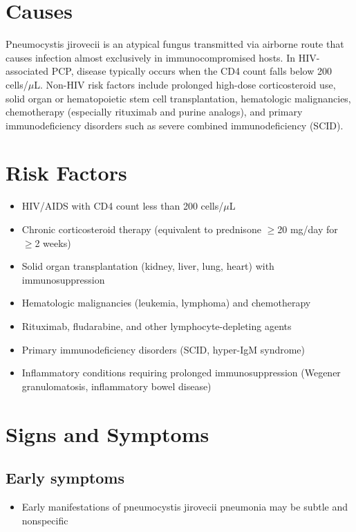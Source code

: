 \section{Causes}
Pneumocystis jirovecii is an atypical fungus transmitted via airborne route that causes infection almost exclusively in immunocompromised hosts. In HIV-associated PCP, disease typically occurs when the CD4 count falls below 200 cells/$\mu$L. Non-HIV risk factors include prolonged high-dose corticosteroid use, solid organ or hematopoietic stem cell transplantation, hematologic malignancies, chemotherapy (especially rituximab and purine analogs), and primary immunodeficiency disorders such as severe combined immunodeficiency (SCID).

\section{Risk Factors}

\begin{itemize}[noitemsep]
  \item HIV/AIDS with CD4 count less than 200 cells/$\mu$L
  \item Chronic corticosteroid therapy (equivalent to prednisone $\ge$20 mg/day for $\ge$2 weeks)
  \item Solid organ transplantation (kidney, liver, lung, heart) with immunosuppression
  \item Hematologic malignancies (leukemia, lymphoma) and chemotherapy
  \item Rituximab, fludarabine, and other lymphocyte-depleting agents
  \item Primary immunodeficiency disorders (SCID, hyper-IgM syndrome)
  \item Inflammatory conditions requiring prolonged immunosuppression (Wegener granulomatosis, inflammatory bowel disease)
\end{itemize}

\section{Signs and Symptoms}

\subsection{Early symptoms}
\begin{itemize}[noitemsep]
  \item Early manifestations of pneumocystis jirovecii pneumonia may be subtle and nonspecific
\end{itemize}

